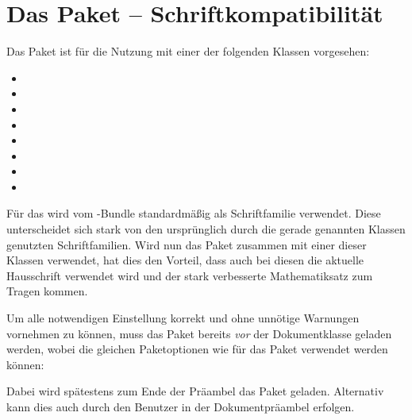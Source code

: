 \section{Das Paket  -- Schriftkompatibilität}
\begin{Bundle*}{}
%
Das Paket  ist für die Nutzung mit einer der folgenden 
Klassen vorgesehen:
\begin{itemize}
\item {}
\item {}
\item {}
\item {}
\item {}
\item {}
\item {}
\item {}
\end{itemize}
%
Für das \TUDCD wird vom \TUDScript-Bundle standardmäßig \OpenSans als 
Schriftfamilie verwendet. Diese unterscheidet sich stark von den ursprünglich 
durch die gerade genannten Klassen genutzten Schriftfamilien. Wird nun das 
Paket  zusammen mit einer dieser Klassen verwendet, 
hat dies den Vorteil, dass auch bei diesen die aktuelle Hausschrift verwendet 
wird und der stark verbesserte Mathematiksatz zum Tragen kommen.
%

Um alle notwendigen Einstellung korrekt und ohne unnötige Warnungen vornehmen 
zu können, muss das Paket  bereits \emph{vor} der 
Dokumentklasse geladen werden, wobei die gleichen Paketoptionen wie für das 
Paket  verwendet werden können:
%
%
Dabei wird spätestens zum Ende der Präambel das Paket  
geladen. Alternativ kann dies auch durch den Benutzer in der Dokumentpräambel 
erfolgen.
\end{Bundle*}



